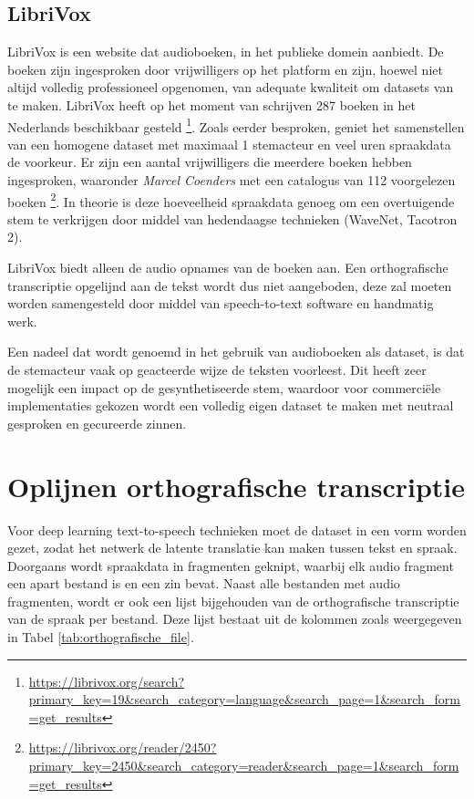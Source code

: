 \subsection{LibriVox}
LibriVox is een website dat audioboeken, in het publieke domein aanbiedt. De boeken zijn ingesproken door vrijwilligers op het platform en zijn, hoewel niet altijd volledig professioneel opgenomen, van adequate kwaliteit om datasets van te maken. LibriVox heeft op het moment van schrijven 287 boeken in het Nederlands beschikbaar gesteld \footnote{\url{https://librivox.org/search?primary_key=19&search_category=language&search_page=1&search_form=get_results}}. Zoals eerder besproken, geniet het samenstellen van een homogene dataset met maximaal 1 stemacteur en veel uren spraakdata de voorkeur. Er zijn een aantal vrijwilligers die meerdere boeken hebben ingesproken, waaronder \textit{Marcel Coenders} met een catalogus van 112 voorgelezen boeken \footnote{\url{https://librivox.org/reader/2450?primary_key=2450&search_category=reader&search_page=1&search_form=get_results}}. In theorie is deze hoeveelheid spraakdata genoeg om een overtuigende stem te verkrijgen door middel van hedendaagse technieken (WaveNet, Tacotron 2).

LibriVox biedt alleen de audio opnames van de boeken aan. Een orthografische transcriptie opgelijnd aan de tekst wordt dus niet aangeboden, deze zal moeten worden samengesteld door middel van speech-to-text software en handmatig werk.

Een nadeel dat wordt genoemd in het gebruik van audioboeken als dataset, is dat de stemacteur vaak op geacteerde wijze de teksten voorleest. Dit heeft zeer mogelijk een impact op de gesynthetiseerde stem, waardoor voor commerciële implementaties gekozen wordt een volledig eigen dataset te maken met neutraal gesproken en gecureerde zinnen.

\section{Oplijnen orthografische transcriptie}
Voor deep learning text-to-speech technieken moet de dataset in een vorm worden gezet, zodat het netwerk de latente translatie kan maken tussen tekst en spraak. Doorgaans wordt spraakdata in fragmenten geknipt, waarbij elk audio fragment een apart bestand is en een zin bevat. Naast alle bestanden met audio fragmenten, wordt er ook een lijst bijgehouden van de orthografische transcriptie van de spraak per bestand. Deze lijst bestaat uit de kolommen zoals weergegeven in Tabel \ref{tab:orthografische_file}.

